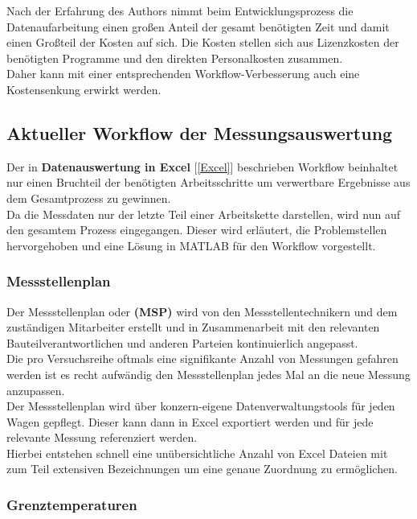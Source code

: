 Nach der Erfahrung des Authors nimmt beim Entwicklungsprozess die Datenaufarbeitung einen großen Anteil der gesamt benötigten Zeit und damit einen Großteil der Kosten auf sich. Die Kosten stellen sich aus Lizenzkosten der benötigten Programme und den direkten Personalkosten zusammen. \\
Daher kann mit einer entsprechenden Workflow-Verbesserung auch eine Kostensenkung erwirkt werden. \\

\newpage
\subsection{Aktueller Workflow der Messungsauswertung}

Der in \textbf{Datenauswertung in Excel} [\ref{Excel}] beschrieben Workflow beinhaltet nur einen Bruchteil der benötigten Arbeitsschritte um verwertbare Ergebnisse aus dem Gesamtprozess zu gewinnen. \\

Da die Messdaten nur der letzte Teil einer Arbeitskette darstellen, wird nun auf den gesamtem Prozess eingegangen. Dieser wird erläutert, die Problemstellen hervorgehoben und eine Lösung in MATLAB für den Workflow vorgestellt. \\


\subsubsection{Messstellenplan}

Der Messstellenplan oder \textbf{(MSP)} wird von den Messstellentechnikern und dem zuständigen Mitarbeiter erstellt und in Zusammenarbeit mit den relevanten Bauteilverantwortlichen und anderen Parteien kontinuierlich angepasst.\\
Die pro Versuchsreihe oftmals eine signifikante Anzahl von Messungen gefahren werden ist es recht aufwändig den Messstellenplan jedes Mal an die neue Messung anzupassen. \\
Der Messstellenplan wird über konzern-eigene Datenverwaltungstools für jeden Wagen gepflegt. Dieser kann dann in Excel exportiert werden und für jede relevante Messung referenziert werden. \\
Hierbei entstehen schnell eine unübersichtliche Anzahl von Excel Dateien mit zum Teil extensiven Bezeichnungen um eine genaue Zuordnung zu ermöglichen. \\

\subsubsection{Grenztemperaturen}

